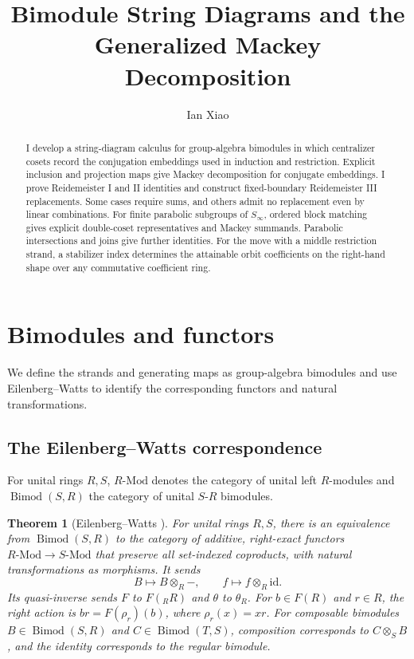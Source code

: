 \documentclass[11pt,a4paper]{article}
\title{\textbf{Bimodule String Diagrams and the\\Generalized Mackey Decomposition}}
\author{Ian Xiao}
\date{}
\numberwithin{equation}{section}
\newtheorem{theorem}{Theorem}[section]
\theoremstyle{definition}
\newcommand{\Mod}{\text{-}\mathrm{Mod}}
\newcommand{\Bimod}{\operatorname{Bimod}}
\newcommand{\id}{\mathrm{id}}
\begin{document}
\maketitle
\begin{abstract}
\noindent
I develop a string-diagram calculus for group-algebra bimodules in which
centralizer cosets record the conjugation embeddings used in induction
and restriction. Explicit inclusion and projection maps give Mackey
decomposition for conjugate embeddings. I prove Reidemeister I and II
identities and construct fixed-boundary Reidemeister III replacements.
Some cases require sums, and others admit no replacement even by linear
combinations. For finite parabolic subgroups of \(S_\infty\), ordered
block matching gives explicit double-coset representatives and Mackey
summands. Parabolic intersections and joins give further identities. For
the move with a middle restriction strand, a stabilizer index determines
the attainable orbit coefficients on the right-hand shape over any
commutative coefficient ring.
\end{abstract}

\makeatletter
\begingroup
\fontsize{10pt}{10.5pt}\selectfont
\setlength{\parskip}{0pt}
\renewcommand*{\l@section}[2]{%
  \addvspace{.2em}%
  \@dottedtocline{1}{0em}{1.7em}{\bfseries #1}{\bfseries #2}}
\renewcommand*{\l@subsection}{\@dottedtocline{2}{1.7em}{2.6em}}
\tableofcontents
\endgroup
\makeatother

\section{Bimodules and functors}

We define the strands and generating maps as group-algebra bimodules
and use Eilenberg--Watts to identify the corresponding functors and
natural transformations.
\subsection{The Eilenberg--Watts correspondence}

For unital rings \(R,S\), \(R\Mod\) denotes the category of unital left
\(R\)-modules and \(\Bimod(S,R)\) the category of unital \(S\)-\(R\)
bimodules.

\begin{theorem}[Eilenberg--Watts \cite{watts,getcurious}]\label{thm:ew}
For unital rings \(R,S\), there is an equivalence from \(\Bimod(S,R)\)
to the category of additive, right-exact functors \(R\Mod\to S\Mod\)
that preserve all set-indexed coproducts, with natural transformations
as morphisms. It sends
\[
  B\longmapsto B\otimes_R-,\qquad f\longmapsto f\otimes_R\id .
\]
Its quasi-inverse sends \(F\) to \(F({}_R R)\) and \(\theta\) to
\(\theta_R\). For \(b\in F(R)\) and \(r\in R\), the right action is
\(br=F(\rho_r)(b)\), where \(\rho_r(x)=xr\). For composable bimodules
\(B\in\Bimod(S,R)\) and \(C\in\Bimod(T,S)\), composition corresponds to
\(C\otimes_S B\), and the identity corresponds to the regular bimodule.
\end{theorem}
\end{document}
